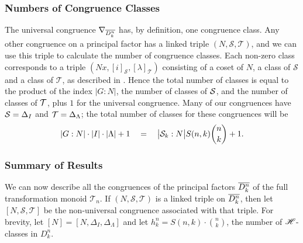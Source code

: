 \subsubsection{Numbers of Congruence Classes}
\label{sec:nrclasses}
The universal congruence $\nabla_{\overline{D_k^n}}$ has, by definition, one
congruence class.  Any other congruence on a principal factor has a linked
triple $(N,\mathcal{S},\mathcal{T})$, and we can use this triple to calculate
the number of congruence classes.  Each non-zero class corresponds to a triple
$(Nx,[i]_\mathcal{S},[\lambda]_\mathcal{T})$ consisting of a coset of $N$, a
class of $\mathcal{S}$ and a class of $\mathcal{T}$, as described in
\cite[Theorem 3.2]{mtorpey_pre_msc}.  Hence the total number of classes is equal
to the product of the index $|G:N|$, the number of classes of $\mathcal{S}$, and the
number of classes of $\mathcal{T}$, plus $1$ for the universal congruence.  Many of our
congruences have $\mathcal{S}=\Delta_I$ and $\mathcal{T}=\Delta_\Lambda$; the total number of
classes for these congruences will be
$$|G:N| \cdot |I| \cdot |\Lambda| + 1
\quad=\quad \big|\mathcal{S}_k:N\big| S(n,k) \binom{n}{k} + 1.$$

\subsubsection{Summary of Results}
\label{sec:summary}
We can now describe all the congruences of the principal factors $\overline{D_k^n}$ of
the full transformation monoid $\mathcal{T}_n$.  If
$(N,\mathcal{S},\mathcal{T})$ is a linked triple on $\overline{D_k^n}$, then let
$[N,\mathcal{S},\mathcal{T}]$ be the non-universal congruence associated with
that triple.  For brevity, let $[N] = [N, \Delta_I, \Delta_\Lambda]$ and let
$h_k^n = S(n,k) \cdot \binom{n}{k}$, the number of $\mathrel{\mathscr{H}}$-classes in $D_k^n$.

